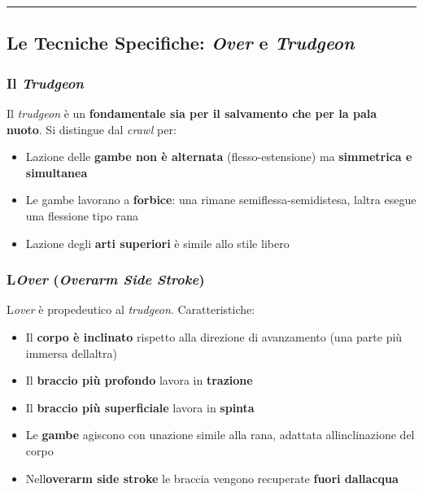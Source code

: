 \documentclass[a4paper,11pt]{article}
\providecommand{\tightlist}{%
  \setlength{\itemsep}{0pt}\setlength{\parskip}{0pt}}
\begin{document}
\begin{center}\rule{0.5\linewidth}{0.5pt}\end{center}

\subsection{\texorpdfstring{Le Tecniche Specifiche: \emph{Over} e
            \emph{Trudgeon}}{Le Tecniche Specifiche: Over e Trudgeon}}\label{le-tecniche-specifiche-over-e-trudgeon}

\subsubsection{\texorpdfstring{Il
            \emph{Trudgeon}}{Il Trudgeon}}\label{il-trudgeon}

Il \emph{trudgeon} è un \textbf{fondamentale sia per il salvamento che
      per la pala nuoto}. Si distingue dal \emph{crawl} per:

\begin{itemize}
      \tightlist
      \item
            L\textquotesingle azione delle \textbf{gambe non è alternata}
            (flesso-estensione) ma \textbf{simmetrica e simultanea}
      \item
            Le gambe lavorano a \textbf{forbice}: una rimane
            semiflessa-semidistesa, l\textquotesingle altra esegue una flessione
            tipo rana
      \item
            L\textquotesingle azione degli \textbf{arti superiori} è simile allo
            stile libero
\end{itemize}

\subsubsection{\texorpdfstring{L\textquotesingle{}\emph{Over}
            (\emph{Overarm Side
                  Stroke})}{L\textquotesingle Over (Overarm Side Stroke)}}\label{lover-overarm-side-stroke}

L\textquotesingle{}\emph{over} è propedeutico al \emph{trudgeon}.
Caratteristiche:

\begin{itemize}
      \tightlist
      \item
            Il \textbf{corpo è inclinato} rispetto alla direzione di avanzamento
            (una parte più immersa dell\textquotesingle altra)
      \item
            Il \textbf{braccio più profondo} lavora in \textbf{trazione}
      \item
            Il \textbf{braccio più superficiale} lavora in \textbf{spinta}
      \item
            Le \textbf{gambe} agiscono con un\textquotesingle azione simile alla
            rana, adattata all\textquotesingle inclinazione del corpo
      \item
            Nell\textquotesingle{}\textbf{overarm side stroke} le braccia vengono
            recuperate \textbf{fuori dall\textquotesingle acqua}
\end{itemize}
\end{document}
